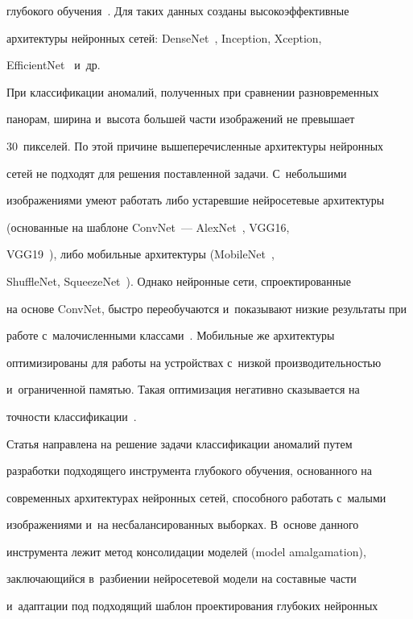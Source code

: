 глубокого обучения~\cite{9-ar}. Для таких данных созданы высокоэффективные 


архитектуры нейронных сетей: DenseNet~\cite{10-ar}, Inception, Xception, 


EfficientNet~\cite{9-ar} и~др.


  


  При классификации аномалий, полученных при сравнении разновременных 


панорам, ширина и~высота большей части изображений не превышает 


30~пикселей. По этой причине вышеперечисленные архитектуры нейронных 


сетей не подходят для решения поставленной задачи. С~небольшими 


изображениями умеют работать либо устаревшие нейросетевые архитектуры 


(основанные на шаблоне ConvNet~--- AlexNet~\cite{8-ar}, VGG16, 


VGG19~\cite{11-ar}), либо мобильные архитектуры (MobileNet~\cite{12-ar}, 


ShuffleNet, SqueezeNet~\cite{9-ar}). Однако нейронные сети, спроектированные 


на основе ConvNet, быстро переобучаются и~показывают низкие результаты при 


работе с~малочисленными классами~\cite{13-ar}. Мобильные же архитектуры 


оптимизированы для работы на устройствах с~низкой производительностью 


и~ограниченной памятью. Такая оптимизация негативно сказывается на 


точности классификации~\cite{9-ar}.


  


  Статья направлена на решение задачи классификации аномалий путем 


разработки подходящего инструмента глубокого обучения, основанного на 


современных архитектурах нейронных сетей, способного работать с~малыми 


изображениями и~на несбалансированных выборках. В~основе данного 


инструмента лежит метод консолидации моделей (model amalgamation), 


заключающийся в~разбиении нейросетевой модели на составные части 


и~адаптации под подходящий шаблон проектирования глубоких нейронных 


